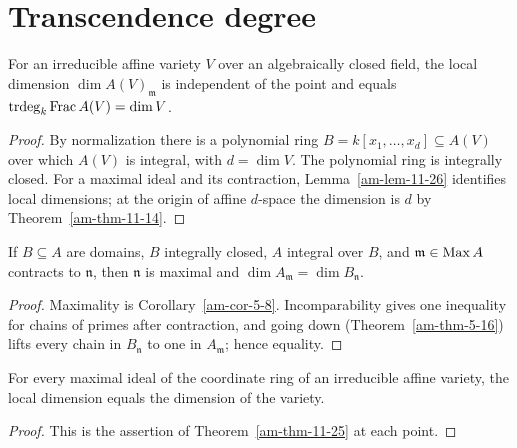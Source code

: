 \section{Transcendence degree}
\label{am-ch11-transcendence}
\begin{theorem}
\label{am-thm-11-25}
\uses{}
For an irreducible affine variety $V$ over an algebraically closed field, the
local dimension $\dim A(V)_\mathfrak{m}$ is independent of the point and equals
$\operatorname{trdeg}_k\operatorname{Frac} A(V)=\dim V$.
\end{theorem}
\begin{proof}
By normalization there is a polynomial ring
$B=k[x_1,\ldots,x_d]\subseteq A(V)$ over which $A(V)$ is integral, with
$d=\dim V$.  The polynomial ring is integrally closed.  For a maximal ideal
and its contraction, Lemma~\ref{am-lem-11-26} identifies local dimensions; at
the origin of affine $d$-space the dimension is $d$ by Theorem~\ref{am-thm-11-14}.
\end{proof}
\begin{lemma}
\label{am-lem-11-26}
\uses{}
If $B\subseteq A$ are domains, $B$ integrally closed, $A$ integral over $B$,
and $\mathfrak{m}\in\operatorname{Max} A$ contracts to $\mathfrak{n}$, then $\mathfrak{n}$ is maximal and
$\dim A_\mathfrak{m}=\dim B_\mathfrak{n}$.
\end{lemma}
\begin{proof}
Maximality is Corollary~\ref{am-cor-5-8}.  Incomparability gives one inequality
for chains of primes after contraction, and going down (Theorem~\ref{am-thm-5-16})
 lifts every chain in $B_\mathfrak{n}$ to one in $A_\mathfrak{m}$; hence equality.
\end{proof}
\begin{corollary}
\label{am-cor-11-27}
\uses{}
For every maximal ideal of the coordinate ring of an irreducible affine variety,
the local dimension equals the dimension of the variety.
\end{corollary}
\begin{proof}
This is the assertion of Theorem~\ref{am-thm-11-25} at each point.
\end{proof}
